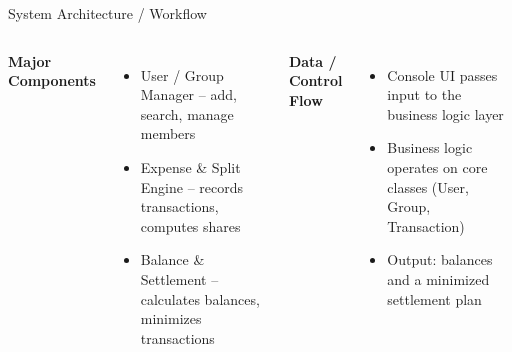 \documentclass[aspectratio=169,11pt]{beamer}
\begin{document}
\begin{frame}{System Architecture / Workflow}
\begin{center}
\end{center}
\vspace{3mm}
\begin{columns}[T,totalwidth=\textwidth]
\small
\textbf{\color{GEUBlue}Major Components}
\begin{itemize}\itemsep1pt
\item User / Group Manager -- add, search, manage members
\item Expense \& Split Engine -- records transactions, computes shares
\item Balance \& Settlement -- calculates balances, minimizes transactions
\end{itemize}
\small
\textbf{\color{GEUBlue}Data / Control Flow}
\begin{itemize}\itemsep1pt
\item Console UI passes input to the business logic layer
\item Business logic operates on core classes (User, Group, Transaction)
\item Output: balances and a minimized settlement plan
\end{itemize}
\end{columns}
\end{frame}
\end{document}
